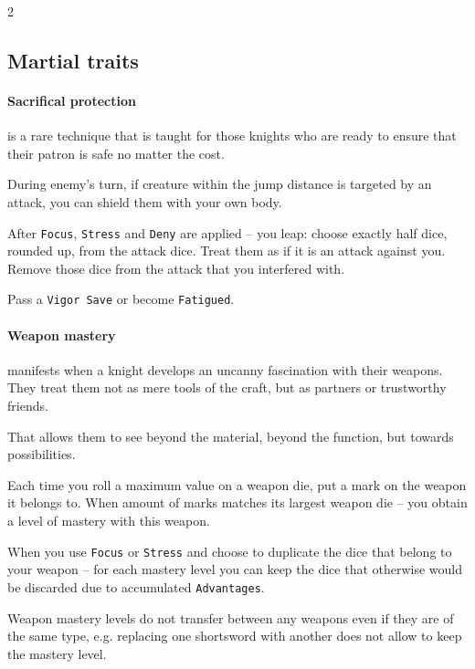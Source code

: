 

\label{sec:traits}

\begin{multicols*}{2}

\subsection*{Martial traits}


\paragraph{Sacrifical protection} is a rare technique that is taught for those knights who are ready to ensure that their patron is safe no matter the cost.

During enemy's turn, if creature within the jump distance is targeted by an attack, you can shield them with your own body.

After \texttt{Focus}, \texttt{Stress} and \texttt{Deny} are applied -- you leap: choose exactly half dice, rounded up, from the attack dice. 
Treat them as if it is an attack against you. Remove those dice from the attack that you interfered with.

Pass a \texttt{Vigor Save} or become \texttt{Fatigued}.

\paragraph{Weapon mastery} manifests when a knight develops an uncanny fascination with their weapons. 
They treat them not as mere tools of the craft, but as partners or trustworthy friends.

That allows them to see beyond the material, beyond the function, but towards possibilities.

Each time you roll a maximum value on a weapon die, put a mark on the weapon it belongs to. 
When amount of marks matches its largest weapon die -- you obtain a level of mastery with this weapon. 

When you use \texttt{Focus} or \texttt{Stress} and choose to duplicate the dice that belong to your weapon -- for each mastery level
you can keep the dice that otherwise would be discarded due to accumulated \texttt{Advantages}.

Weapon mastery levels do not transfer between any weapons even if they are of the same type, e.g. replacing one shortsword with another does not allow to keep the mastery level.


\end{multicols*}

